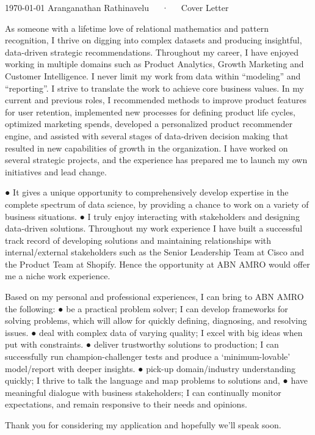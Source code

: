 \documentclass[11pt, a4paper]{awesome-cv}
\begin{document}
\makecvheader[R]
\makecvfooter
  {\today}
  {Aranganathan Rathinavelu~~~·~~~Cover Letter}
  {}
\begin{cvletter}

As someone with a lifetime love of relational mathematics and pattern recognition, I thrive on digging
into complex datasets and producing insightful, data-driven strategic recommendations. Throughout my
career, I have enjoyed working in multiple domains such as Product Analytics, Growth Marketing and
Customer Intelligence.
I never limit my work from data within “modeling” and “reporting”. I strive to translate the work to
achieve core business values. In my current and previous roles, I recommended methods to improve
product features for user retention, implemented new processes for defining product life cycles, optimized
marketing spends, developed a personalized product recommender engine, and assisted with several
stages of data-driven decision making that resulted in new capabilities of growth in the organization. I
have worked on several strategic projects, and the experience has prepared me to launch my own
initiatives and lead change.

● It gives a unique opportunity to comprehensively develop expertise in the complete spectrum of
data science, by providing a chance to work on a variety of business situations.
● I truly enjoy interacting with stakeholders and designing data-driven solutions. Throughout my
work experience I have built a successful track record of developing solutions and maintaining
relationships with internal/external stakeholders such as the Senior Leadership Team at Cisco and
the Product Team at Shopify. Hence the opportunity at ABN AMRO would offer me a niche work
experience.

Based on my personal and professional experiences, I can bring to ABN AMRO the following:
● be a practical problem solver; I can develop frameworks for solving problems, which will allow
for quickly defining, diagnosing, and resolving issues.
● deal with complex data of varying quality; I excel with big ideas when put with constraints.
● deliver trustworthy solutions to production; I can successfully run champion-challenger tests and
produce a ‘minimum-lovable’ model/report with deeper insights.
● pick-up domain/industry understanding quickly; I thrive to talk the language and map problems to
solutions and,
● have meaningful dialogue with business stakeholders; I can continually monitor expectations, and
remain responsive to their needs and opinions.

Thank you for considering my application and hopefully we’ll speak soon.
\end{cvletter}
\makeletterclosing
\end{document}
